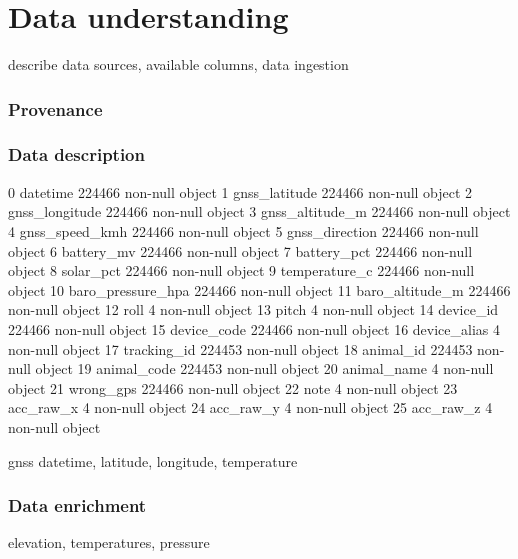 
\chapter{Data understanding}

describe data sources, available columns, data ingestion

\subsection{Provenance}

\subsection{Data description}

0   datetime           224466 non-null  object
1   gnss\_latitude      224466 non-null  object
2   gnss\_longitude     224466 non-null  object
3   gnss\_altitude\_m    224466 non-null  object
4   gnss\_speed\_kmh     224466 non-null  object
5   gnss\_direction     224466 non-null  object
6   battery\_mv         224466 non-null  object
7   battery\_pct        224466 non-null  object
8   solar\_pct          224466 non-null  object
9   temperature\_c      224466 non-null  object
10  baro\_pressure\_hpa  224466 non-null  object
11  baro\_altitude\_m    224466 non-null  object
12  roll               4 non-null       object
13  pitch              4 non-null       object
14  device\_id          224466 non-null  object
15  device\_code        224466 non-null  object
16  device\_alias       4 non-null       object
17  tracking\_id        224453 non-null  object
18  animal\_id          224453 non-null  object
19  animal\_code        224453 non-null  object
20  animal\_name        4 non-null       object
21  wrong\_gps          224466 non-null  object
22  note               4 non-null       object
23  acc\_raw\_x          4 non-null       object
24  acc\_raw\_y          4 non-null       object
25  acc\_raw\_z          4 non-null       object

gnss datetime, latitude, longitude, temperature

\subsection{Data enrichment}

elevation, temperatures, pressure
